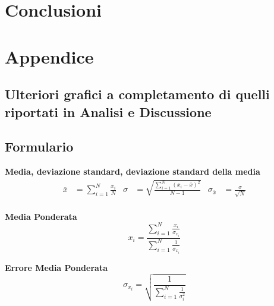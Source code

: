\documentclass[a4paper,11pt,oneside]{article}
\begin{document}
\section{Conclusioni}

\newpage
\section{Appendice}
\subsection{Ulteriori grafici a completamento di quelli riportati in Analisi e Discussione}
\subsection{Formulario}
\textbf{Media, deviazione standard, deviazione standard della media}
\begin{align*}
        \overline{x}&=\sum\limits_{i=1}^{N} \frac{x_{i}}{N}&
        \sigma&=\sqrt{\frac{\sum\limits_{i=1}^{N} (x_{i}-\overline{x})^2}{N-1}}&
        \sigma_{\overline{x}}&=\frac{\sigma}{\sqrt{N}}
\end{align*}\\

\textbf{Media Ponderata}
\begin{equation*}
\label{eq:media_pond}
    x_i=\frac{\sum_{i=1}^{N}\frac{x_i}{\sigma_{x_i}}}{\sum_{i=1}^{N}\frac{1}{\sigma_{x_i}}}
\end{equation*}

\textbf{Errore Media Ponderata}
\begin{equation*}
\label{eq:errore_media_pond}
     \sigma_{x_i}=\sqrt{\frac{1}{\sum_{i=1}^{N}\frac{1}{\sigma_{i}^{2}}}}
\end{equation*}
\end{document}
